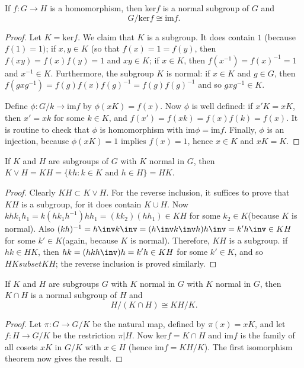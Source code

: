 \documentclass[11pt]{scrartcl}
\begin{document}
\begin{theorem}  
    If $f:G \to H$ is a homomorphism, then ker$f$ is a normal subgroup of $G$ and $$ G/\text{ker}f \cong \text{im}f.$$
\end{theorem}
\begin{proof}
    Let $K = \text{ker}f$. We claim that $K$ is a subgroup. It does contain $1$ (because $f(1) = 1)$; if $x,y \in K$ (so that $f(x) = 1 = f(y)$, then $f(xy) = f(x)f(y) =1$ and $xy \in K$; if $x \in K$, then $f(x^{-1}) = f(x)^{-1} = 1$ and $x^{-1} \in K$. Furthermore, the subgroup $K$ is normal: if $x\in K$ and $g\in G$, then $f(gxg^{-1}) = f(g)f(x)f(g)^{-1} = f(g)f(g)^{-1}$ and so $gxg^{-1} \in K$.
    
    Define $\phi: G/k \to \text{im}f$ by $\phi(xK) = f(x)$. Now $\phi$ is well defined: if $x'K = xK$, then $x' = xk$ for some $k\in K$, and $f(x') = f(xk) = f(x)f(k) = f(x)$. It is routine to check that $\phi$ is homomorphism with $\text{im}\phi = \text{im}f$. Finally, $\phi$ is an injection, because $\phi(xK)=1$ implies $f(x)=1$, hence $x\in K$ and $xK = K$.
\end{proof}

\begin{lemma}
    If $K$ and $H$ are subgroups of $G$ with $K$ normal in $G$, then $K \vee H = KH = \{kh : k \in K \text{ and } h \in H \} = HK.$
\end{lemma}
\begin{proof}
    Clearly $KH \subset K \vee H$. For the reverse inclusion, it suffices to prove that $KH$ is a subgroup, for it does contain $K \cup H$.
    Now $khk_1h_1 = k(hk_1h^{-1})hh_1 = (kk_2)(hh_1) \in KH$ for some $k_2 \in K$(because $K$ is normal). Also $(kh)^{-1} = h\inv k\inv = (h\inv k\inv h)h\inv = k'h\inv \in KH$ for some $k' \in K$(again, because $K$ is normal). Therefore, $KH$ is a subgroup.
    if $hk \in HK$, then $hk = (hkh\inv)h = k'h \in KH$ for some $k' \in K$, and so $HK subset KH$; the reverse inclusion is proved similarly. 
\end{proof}

\begin{theorem}
    If $K$ and $H$ are subgroups $G$ with $K$ normal in $G$ with $K$ normal in $G$, then $K \cap H$ is a normal subgroup of $H$ and $$ H/(K\cap H) \cong KH/K.$$        
\end{theorem}

\begin{proof}
     Let $\pi: G \to G/K$ be the natural map, defined by $\pi(x) = xK$, and let $f: H \to G/K$ be the restriction $ \pi | H$. Now ker$f = K \cap H$ and im$f$ is the family of all cosets $xK$ in $G/K$ with $x\in H$ (hence im$f=KH/K$). The first isomorphism theorem now gives the result.
\end{proof}
\end{document}
